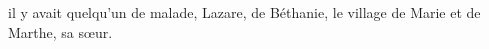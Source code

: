 \encetemps il y avait quelqu’un de malade,
	Lazare, de Béthanie, le village de Marie et de Marthe, sa sœur.
